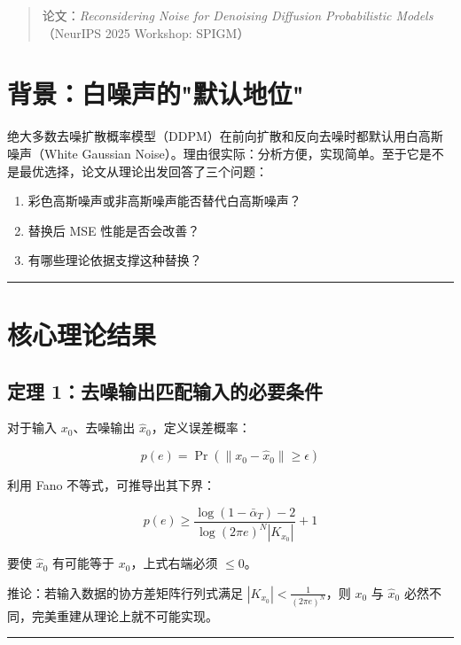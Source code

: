 \begin{quote}
论文：\emph{Reconsidering Noise for Denoising Diffusion Probabilistic Models}（NeurIPS 2025 Workshop: SPIGM）
\end{quote}

\section{背景：白噪声的"默认地位"}

绝大多数去噪扩散概率模型（DDPM）在前向扩散和反向去噪时都默认用白高斯噪声（White Gaussian Noise）。理由很实际：分析方便，实现简单。至于它是不是最优选择，论文从理论出发回答了三个问题：

\begin{enumerate}
  \item 彩色高斯噪声或非高斯噪声能否替代白高斯噪声？
  \item 替换后 MSE 性能是否会改善？
  \item 有哪些理论依据支撑这种替换？
\end{enumerate}

\hrule

\section{核心理论结果}

\subsection{定理 1：去噪输出匹配输入的必要条件}

对于输入 \(x_0\)、去噪输出 \(\hat{x}_0\)，定义误差概率：

\[
p(e) = \Pr(\|x_0 - \hat{x}_0\| \geq \epsilon)
\]

利用 Fano 不等式，可推导出其下界：

\[
p(e) \geq \frac{\log(1-\bar{\alpha}_T) - 2}{\log(2\pi e)^N |K_{x_0}|} + 1
\]

要使 \(\hat{x}_0\) 有可能等于 \(x_0\)，上式右端必须 \(\leq 0\)。

推论：若输入数据的协方差矩阵行列式满足 \(|K_{x_0}| < \frac{1}{(2\pi e)^N}\)，则 \(x_0\) 与 \(\hat{x}_0\) 必然不同，完美重建从理论上就不可能实现。

\hrule


